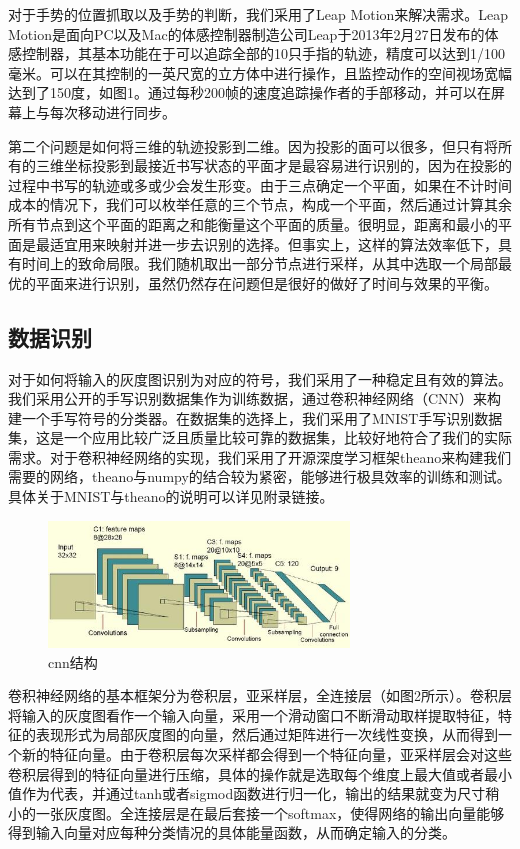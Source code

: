 \documentclass[10pt, twocolumn]{article}
\begin{document}
	对于手势的位置抓取以及手势的判断，我们采用了Leap Motion来解决需求。Leap Motion是面向PC以及Mac的体感控制器制造公司Leap于2013年2月27日发布的体感控制器，其基本功能在于可以追踪全部的10只手指的轨迹，精度可以达到1/100毫米。可以在其控制的一英尺宽的立方体中进行操作，且监控动作的空间视场宽幅达到了150度，如图1。通过每秒200帧的速度追踪操作者的手部移动，并可以在屏幕上与每次移动进行同步。	

	第二个问题是如何将三维的轨迹投影到二维。因为投影的面可以很多，但只有将所有的三维坐标投影到最接近书写状态的平面才是最容易进行识别的，因为在投影的过程中书写的轨迹或多或少会发生形变。由于三点确定一个平面，如果在不计时间成本的情况下，我们可以枚举任意的三个节点，构成一个平面，然后通过计算其余所有节点到这个平面的距离之和能衡量这个平面的质量。很明显，距离和最小的平面是最适宜用来映射并进一步去识别的选择。但事实上，这样的算法效率低下，具有时间上的致命局限。我们随机取出一部分节点进行采样，从其中选取一个局部最优的平面来进行识别，虽然仍然存在问题但是很好的做好了时间与效果的平衡。

	\subsection{数据识别}

	对于如何将输入的灰度图识别为对应的符号，我们采用了一种稳定且有效的算法。我们采用公开的手写识别数据集作为训练数据，通过卷积神经网络（CNN）来构建一个手写符号的分类器。在数据集的选择上，我们采用了MNIST手写识别数据集，这是一个应用比较广泛且质量比较可靠的数据集，比较好地符合了我们的实际需求。对于卷积神经网络的实现，我们采用了开源深度学习框架theano来构建我们需要的网络，theano与numpy的结合较为紧密，能够进行极具效率的训练和测试。具体关于MNIST与theano的说明可以详见附录链接。


	\begin{figure}[htb]
	\centering
	\begin{minipage}[t]{1\linewidth}
	\centering
	\includegraphics[width=8cm]{cnn1.jpg}
	\caption{cnn结构}
	\label{fig: structure_cnn}
	\end{minipage}
	\end{figure}

	卷积神经网络的基本框架分为卷积层，亚采样层，全连接层（如图2所示）。卷积层将输入的灰度图看作一个输入向量，采用一个滑动窗口不断滑动取样提取特征，特征的表现形式为局部灰度图的向量，然后通过矩阵进行一次线性变换，从而得到一个新的特征向量。由于卷积层每次采样都会得到一个特征向量，亚采样层会对这些卷积层得到的特征向量进行压缩，具体的操作就是选取每个维度上最大值或者最小值作为代表，并通过tanh或者sigmod函数进行归一化，输出的结果就变为尺寸稍小的一张灰度图。全连接层是在最后套接一个softmax，使得网络的输出向量能够得到输入向量对应每种分类情况的具体能量函数，从而确定输入的分类。
\end{document}
